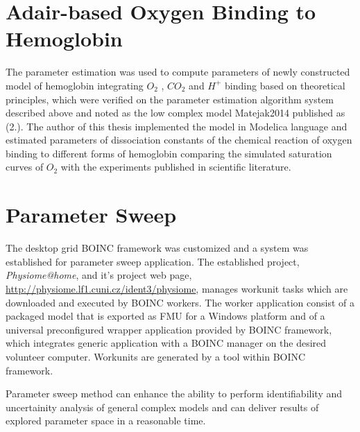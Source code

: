 \section{Adair-based Oxygen Binding to Hemoglobin}
The parameter estimation was used to compute parameters of newly constructed model of hemoglobin integrating $O_2$ , $CO_2$ and $H^+$ binding based on theoretical principles, which were verified on the parameter estimation algorithm system described above and noted as the low complex model Matejak2014 published as (2.).
The author of this thesis implemented the model in Modelica language and estimated parameters of dissociation constants of the chemical reaction of oxygen binding to different forms of hemoglobin comparing the simulated saturation curves of $O_2$ with the experiments published in scientific literature.

\section{Parameter Sweep}
The desktop grid BOINC framework was customized and a system was established for parameter sweep application. The established project, \emph{Physiome@home}, and it's project web page, \url{http://physiome.lf1.cuni.cz/ident3/physiome}, manages workunit tasks which are downloaded and executed by BOINC workers. The worker application consist of a packaged model that is exported as FMU for a Windows platform and of a universal preconfigured wrapper application provided by BOINC framework, which integrates generic application with a BOINC manager on the desired volunteer computer. Workunits are generated by a tool within BOINC framework.

Parameter sweep method can enhance the ability to perform identifiability and uncertainity analysis of general complex models and can deliver results of explored parameter space in a reasonable time.


